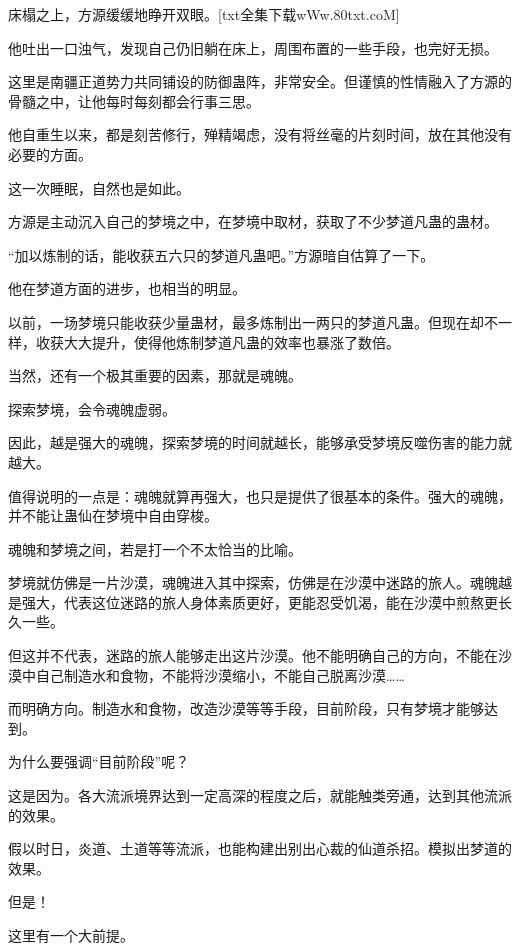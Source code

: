 
\begin{this_body}

床榻之上，方源缓缓地睁开双眼。[txt全集下载wWw.80txt.coM]

他吐出一口浊气，发现自己仍旧躺在床上，周围布置的一些手段，也完好无损。

这里是南疆正道势力共同铺设的防御蛊阵，非常安全。但谨慎的性情融入了方源的骨髓之中，让他每时每刻都会行事三思。

他自重生以来，都是刻苦修行，殚精竭虑，没有将丝毫的片刻时间，放在其他没有必要的方面。

这一次睡眠，自然也是如此。

方源是主动沉入自己的梦境之中，在梦境中取材，获取了不少梦道凡蛊的蛊材。

“加以炼制的话，能收获五六只的梦道凡蛊吧。”方源暗自估算了一下。

他在梦道方面的进步，也相当的明显。

以前，一场梦境只能收获少量蛊材，最多炼制出一两只的梦道凡蛊。但现在却不一样，收获大大提升，使得他炼制梦道凡蛊的效率也暴涨了数倍。

当然，还有一个极其重要的因素，那就是魂魄。

探索梦境，会令魂魄虚弱。

因此，越是强大的魂魄，探索梦境的时间就越长，能够承受梦境反噬伤害的能力就越大。

值得说明的一点是：魂魄就算再强大，也只是提供了很基本的条件。强大的魂魄，并不能让蛊仙在梦境中自由穿梭。

魂魄和梦境之间，若是打一个不太恰当的比喻。

梦境就仿佛是一片沙漠，魂魄进入其中探索，仿佛是在沙漠中迷路的旅人。魂魄越是强大，代表这位迷路的旅人身体素质更好，更能忍受饥渴，能在沙漠中煎熬更长久一些。

但这并不代表，迷路的旅人能够走出这片沙漠。他不能明确自己的方向，不能在沙漠中自己制造水和食物，不能将沙漠缩小，不能自己脱离沙漠……

而明确方向。制造水和食物，改造沙漠等等手段，目前阶段，只有梦境才能够达到。

为什么要强调“目前阶段”呢？

这是因为。各大流派境界达到一定高深的程度之后，就能触类旁通，达到其他流派的效果。

假以时日，炎道、土道等等流派，也能构建出别出心裁的仙道杀招。模拟出梦道的效果。

但是！

这里有一个大前提。


\end{this_body}
